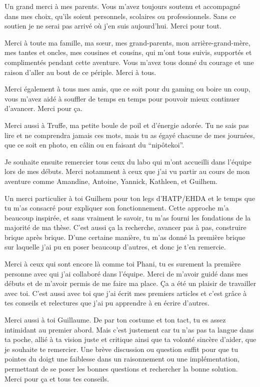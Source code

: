 
Un grand merci à mes parents. Vous m'avez toujours soutenu et accompagné dans mes choix, qu'ils soient personnels, scolaires ou professionnels. Sans ce soutien je ne serai pas arrivé où j'en suis aujourd'hui. Merci pour tout.

Merci à toute ma famille, ma sœur, mes grand-parents, mon arrière-grand-mère, mes tantes et oncles, mes cousines et cousins, qui m'ont tous suivis, supportés et complimentés pendant cette aventure. Vous m'avez tous donné du courage et une raison d'aller au bout de ce périple. Merci à tous.

Merci également à tous mes amis, que ce soit pour du gaming ou boire un coup, vous m'avez aidé à souffler de temps en temps pour pouvoir mieux continuer d'avancer. Merci pour ça.



Merci aussi à Truffe, ma petite boule de poil et d'énergie adorée. Tu ne sais pas lire et ne comprendra jamais ces mots, mais tu as égayé chacune de mes journées, que ce soit en photo, en câlin ou en faisant du ``nipôtekoi''.



Je souhaite ensuite remercier tous ceux du labo qui m'ont accueilli dans l'équipe lors de mes débuts. Merci notamment à ceux que j'ai vu partir au cours de mon aventure comme Amandine, Antoine, Yannick, Kathleen, et Guilhem.

Un merci particulier à toi Guilhem pour ton legs d'HATP/EHDA et le temps que tu m'as consacré pour expliquer son fonctionnement. 
Cette approche m'a beaucoup inspirée, et sans vraiment le savoir, tu m'as fourni les fondations de la majorité de ma thèse. C'est aussi ça la recherche, avancer pas à pas, construire brique après brique. D'une certaine manière, tu m'as donné la première brique sur laquelle j'ai pu en poser beaucoup d'autres, et donc je t'en remercie.

Merci à ceux qui sont encore là comme toi Phani, tu es surement la première personne avec qui j'ai collaboré dans l'équipe. Merci de m'avoir guidé dans mes débuts et de m'avoir permis de me faire ma place. Ça a été un plaisir de travailler avec toi. C'est aussi avec toi que j'ai écrit mes premiers articles et c'est grâce à tes conseils et relectures que j'ai pu apprendre à en écrire d'autres. 

Merci aussi à toi Guillaume. 
De par ton costume et ton tact, tu es assez intimidant au premier abord. 
Mais c'est justement car tu n'as pas ta langue dans ta poche, allié à ta vision juste et critique ainsi que ta volonté sincère d'aider, que je souhaite te remercier. Une brève discussion ou question suffit pour que tu pointes du doigt une faiblesse dans un raisonnement ou une implémentation, permettant de se poser les bonnes questions et rechercher la bonne solution. Merci pour ça et tous tes conseils.


